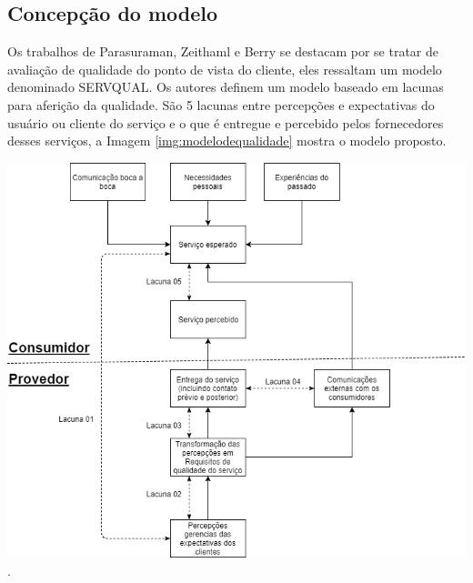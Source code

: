 \subsection{Concepção do modelo}
Os trabalhos de Parasuraman, Zeithaml e Berry se destacam por se tratar de avaliação de qualidade do ponto de vista do cliente, eles ressaltam um modelo denominado SERVQUAL\cite{parasuraman1985}. Os autores definem um modelo baseado em lacunas para aferição da qualidade. São 5 lacunas entre percepções e expectativas do usuário ou cliente do serviço e o que é entregue e percebido pelos fornecedores desses serviços, a Imagem \ref{img:modelodequalidade} mostra o modelo proposto.
\begin{center}
	\includegraphics[width=.75\linewidth]{figuras/modelodequalidade.jpg}
	.
	\label{img:modelodequalidade}
\end{center}

